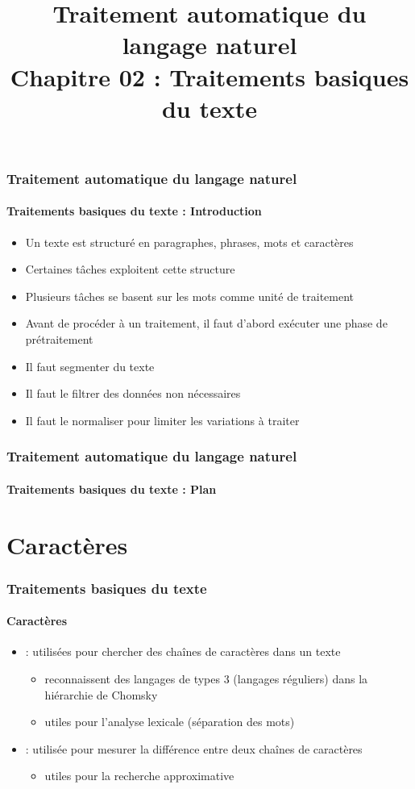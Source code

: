 \documentclass[xcolor=table]{beamer}
\title[TALN : 02- Traitements basiques]%
{Traitement automatique du langage naturel\\Chapitre 02 : Traitements basiques du texte}
\begin{document}
	
\begin{frame}
\frametitle{Traitement automatique du langage naturel}
\framesubtitle{Traitements basiques du texte : Introduction}

\begin{itemize}
	\item Un texte est structuré en paragraphes, phrases, mots et caractères
	\item Certaines tâches exploitent cette structure
	\item Plusieurs tâches se basent sur les mots comme unité de traitement
	\item Avant de procéder à un traitement, il faut d'abord exécuter une phase de prétraitement
	\item Il faut segmenter du texte 
	\item Il faut le filtrer des données non nécessaires
	\item Il faut le normaliser pour limiter les variations à traiter
\end{itemize}

\end{frame}


\begin{frame}
\frametitle{Traitement automatique du langage naturel}
\framesubtitle{Traitements basiques du texte : Plan}

\begin{multicols}{2}
\tableofcontents
\end{multicols}
\end{frame}

\section{Caractères}

\begin{frame}
\frametitle{Traitements basiques du texte}
\framesubtitle{Caractères}

\begin{itemize}
	\item {} : utilisées pour chercher des chaînes de caractères dans un texte
	\begin{itemize}
		\item reconnaissent des langages de types 3 (langages réguliers) dans la hiérarchie de Chomsky 
		\item utiles pour l'analyse lexicale (séparation des mots)
	\end{itemize}
	\item {} : utilisée pour mesurer la différence entre deux chaînes de caractères 
	\begin{itemize}
		\item utiles pour la recherche approximative
	\end{itemize}
\end{itemize}

\end{frame}
\end{document}
